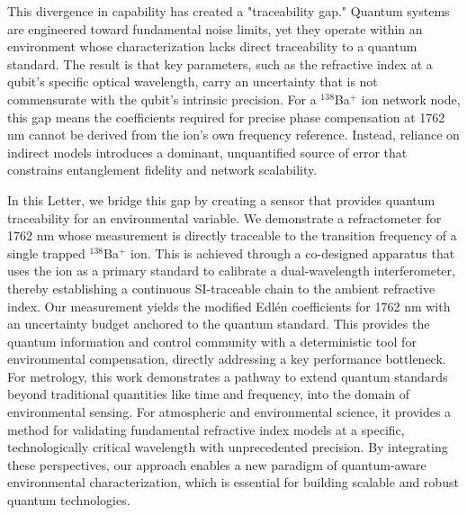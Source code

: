 \documentclass[aip,reprint,groupedaddress,onecolumn,superscriptaddress]{revtex4-2}
\begin{document}
This divergence in capability has created a "traceability gap." Quantum systems are engineered toward fundamental noise limits, yet they operate within an environment whose characterization lacks direct traceability to a quantum standard. The result is that key parameters, such as the refractive index at a qubit's specific optical wavelength, carry an uncertainty that is not commensurate with the qubit's intrinsic precision. For a $^{138}$Ba$^+$ ion network node, this gap means the coefficients required for precise phase compensation at 1762 nm cannot be derived from the ion's own frequency reference. Instead, reliance on indirect models introduces a dominant, unquantified source of error that constrains entanglement fidelity and network scalability.

In this Letter, we bridge this gap by creating a sensor that provides quantum traceability for an environmental variable. We demonstrate a refractometer for 1762 nm whose measurement is directly traceable to the transition frequency of a single trapped $^{138}$Ba$^+$ ion. This is achieved through a co-designed apparatus that uses the ion as a primary standard to calibrate a dual-wavelength interferometer, thereby establishing a continuous SI-traceable chain to the ambient refractive index. Our measurement yields the modified Edlén coefficients for 1762 nm with an uncertainty budget anchored to the quantum standard. This provides the quantum information and control community with a deterministic tool for environmental compensation, directly addressing a key performance bottleneck. For metrology, this work demonstrates a pathway to extend quantum standards beyond traditional quantities like time and frequency, into the domain of environmental sensing. For atmospheric and environmental science, it provides a method for validating fundamental refractive index models at a specific, technologically critical wavelength with unprecedented precision. By integrating these perspectives, our approach enables a new paradigm of quantum-aware environmental characterization, which is essential for building scalable and robust quantum technologies.



\end{document}
